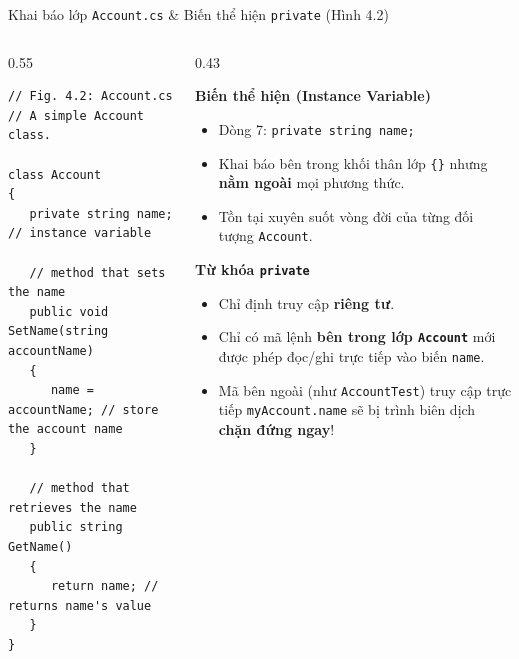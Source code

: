 \documentclass[aspectratio=169, 10pt]{beamer}
\begin{document}
\begin{frame}[fragile]{Khai báo lớp \texttt{Account.cs} \& Biến thể hiện \texttt{private} (Hình 4.2)}
  \begin{columns}[T]
    \begin{column}{0.55\textwidth}
      \begin{tcolorbox}[colback=CodeBg,colframe=UniNavy,title=\textbf{Account.cs (Fig. 4.2)},fonttitle=\small\bfseries]
\begin{lstlisting}
// Fig. 4.2: Account.cs
// A simple Account class.

class Account
{
   private string name; // instance variable

   // method that sets the name
   public void SetName(string accountName)
   {
      name = accountName; // store the account name
   }

   // method that retrieves the name
   public string GetName()
   {
      return name; // returns name's value
   }
}
\end{lstlisting}
      \end{tcolorbox}
    \end{column}

    \begin{column}{0.43\textwidth}
      \begin{exampleblock}{\textbf{Biến thể hiện (Instance Variable)}}
        \begin{itemize}\small
          \item Dòng 7: \texttt{private string name;}
          \item Khai báo bên trong khối thân lớp \texttt{\{\}} nhưng \textbf{nằm ngoài} mọi phương thức.
          \item Tồn tại xuyên suốt vòng đời của từng đối tượng \texttt{Account}.
        \end{itemize}
      \end{exampleblock}
      \begin{alertblock}{\textbf{Từ khóa \texttt{private}}}
        \begin{itemize}\small
          \item Chỉ định truy cập \textbf{riêng tư}.
          \item Chỉ có mã lệnh \textbf{bên trong lớp \texttt{Account}} mới được phép đọc/ghi trực tiếp vào biến \texttt{name}.
          \item Mã bên ngoài (như \texttt{AccountTest}) truy cập trực tiếp \texttt{myAccount.name} sẽ bị trình biên dịch \textbf{chặn đứng ngay}!
        \end{itemize}
      \end{alertblock}
    \end{column}
  \end{columns}
\end{frame}
\end{document}
